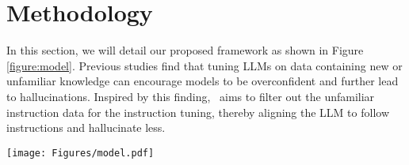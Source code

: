 \section{Methodology}
\label{section:method}
In this section, we will detail our proposed framework \textbf{\OURS} as shown in Figure \ref{figure:model}.
Previous studies \citep{lin2024flame, kang2024unfamiliarfinetuningexamplescontrol,gekhman-etal-2024-fine} find that tuning LLMs on data containing new or unfamiliar knowledge can encourage models to be overconfident and further lead to hallucinations.
Inspired by this finding, \OURS~aims to filter out the unfamiliar instruction data for the instruction tuning, thereby aligning the LLM to follow instructions and hallucinate less.



\begin{figure*}[t]
    \centering
    \vspace{-6.5mm}
    \texttt{[image: Figures/model.pdf]}
    \caption{
     The process of \OURS.
     \OURS~identifies and selects high-quality instruction data that aligns well with the LLM’s learned knowledge to reduce hallucination.
     Then it uses selected instruction data for training LLMs.
    }
    \label{figure:model}
\end{figure*}




